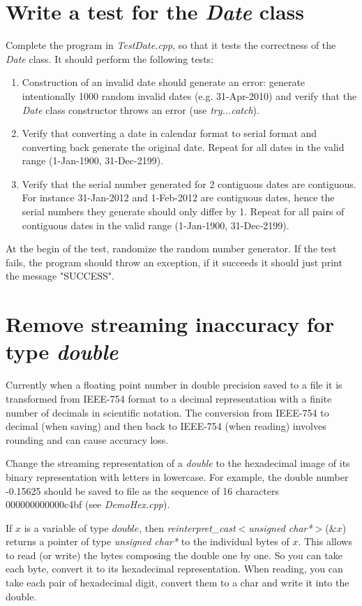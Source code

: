 \documentclass[10pt]{article}
\begin{document}
\section{Write a test for the \textit{Date} class}
Complete the program in \textit{TestDate.cpp}, so that it tests the correctness of the \textit{Date} class. It should perform the following tests:
\begin{enumerate}
\item Construction of an invalid date should generate an error: generate intentionally 1000 random invalid dates (e.g. 31-Apr-2010) and verify that the \textit{Date} class constructor throws an error (use \textit{try...catch}).
\item Verify that converting a date in calendar format to serial format and converting back generate the original date. Repeat for all dates in the valid range (1-Jan-1900, 31-Dec-2199).
\item Verify that the serial number generated for 2 contiguous dates are contiguous. For instance 31-Jan-2012 and 1-Feb-2012 are contiguous dates, hence the serial numbers they generate should only differ by 1. Repeat for all pairs of contiguous dates in the valid range (1-Jan-1900, 31-Dec-2199).
\end{enumerate}
At the begin of the test, randomize the random number generator. If the test fails, the program should throw an exception, if it succeeds it should just print the message "SUCCESS".

\section{Remove streaming inaccuracy for type \textit{double}}
Currently when a floating point number in double precision saved to a file it is transformed from IEEE-754 format to a decimal representation with a finite number of decimals in scientific notation. The conversion from IEEE-754 to decimal (when saving) and then back to IEEE-754 (when reading) involves rounding and can cause accuracy loss.

Change the streaming representation of a \textit{double} to the hexadecimal image of its binary representation with letters in lowercase. For example, the double number -0.15625 should be saved to file as the sequence of 16 characters 000000000000c4bf (see \textit{DemoHex.cpp}).

If $x$ is a variable of type $double$, then \textit{reinterpret\_cast$<$unsigned char*$>$}(\&$x$) returns a pointer of type \textit{unsigned char*} to the individual bytes of $x$. This allows to read (or write) the bytes composing the double one by one. So you can take each byte, convert it to its hexadecimal representation. When reading, you can take each pair of hexadecimal digit, convert them to a char and write it into the double.
\end{document}
